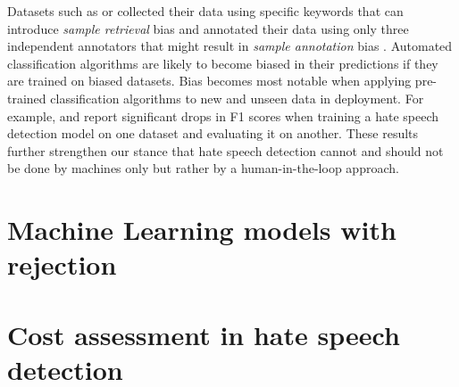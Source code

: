 %
Datasets such as \citet{waseem2016hateful} or \citet{basile2019semeval} collected their data using specific keywords that can introduce \textit{sample retrieval} bias and annotated their data using only three independent annotators that might result in \textit{sample annotation} bias \citep{balayn2021automatic}.
%
Automated classification algorithms are likely to become biased in their predictions if they are trained on biased datasets.
%
Bias becomes most notable when applying pre-trained classification algorithms to new and unseen data in deployment.
%
For example, \citet{grondahl2018all} and \citet{arango2019hate} report significant drops in F1 scores when training a hate speech detection model on one dataset and evaluating it on another.
%
These results further strengthen our stance that hate speech detection cannot and should not be done by machines only but rather by a human-in-the-loop approach.


\section{Machine Learning models with rejection}


\section{Cost assessment in hate speech detection}

